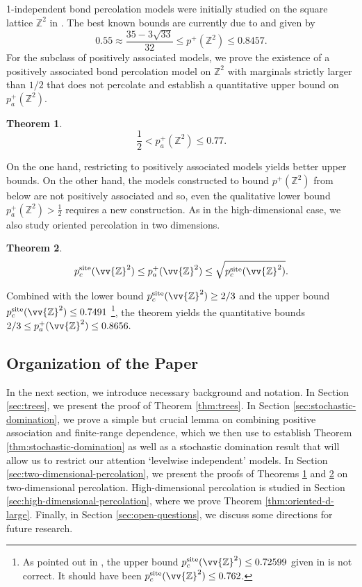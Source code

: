 \documentclass[11pt]{article}
\newcommand{\Z}{\mathbb{Z}}
\newtheorem{theorem}{Theorem}
\theoremstyle{remark}
\begin{document}
1-independent bond percolation models were initially studied on the square lattice $\Z^2$ in \cite{Balister2005}. The best known bounds are currently due to \cite{Balister2022} and given by
\begin{equation*}
	0.55 \approx \frac{35-3\sqrt{33}}{32}\le p^+(\Z^2) \le 0.8457.
\end{equation*} 
For the subclass of positively associated models, we prove the existence of a positively associated bond percolation model on $\Z^2$ with marginals strictly larger than $1/2$ that does not percolate and establish a quantitative upper bound on $p^+_a(\Z^2)$.
\begin{theorem}\label{thm:unoriented-d-2}
	\begin{equation*}
	\frac{1}{2} < p^+_a(\Z^2) \le 0.77.
	\end{equation*} 
\end{theorem}
On the one hand, restricting to positively associated models yields better upper bounds. On the other hand, the models constructed to bound $p^+(\Z^2)$ from below are not positively associated and so, even the qualitative lower bound $p^+_a(\Z^2) > \frac{1}{2}$ requires a new construction.
As in the high-dimensional case, we also study oriented percolation in two dimensions.
\begin{theorem}\label{thm:oriented-d-2}
	\begin{equation*}
		p_c^{\mathrm{site}}(\vv{\Z}^2) \le p_a^+(\vv{\Z}^2) \le  \sqrt{p_c^{\mathrm{site}}(\vv{\Z}^2)}.
	\end{equation*} 
\end{theorem}
Combined with the lower bound $p_c^{\mathrm{site}}(\vv{\Z}^2) \ge 2/3$ \cite{Bishir1963} and the upper bound $p_c^{\mathrm{site}}(\vv{\Z}^2) \le 0.7491$ \cite{balister1994improved}\footnote{As pointed out in \cite{balister1994improved}, the upper bound $p_c^{\mathrm{site}}(\vv{\Z}^2) \le 0.72599$ given in \cite{Balister1993} is not correct. It should have been $p_c^{\mathrm{site}}(\vv{\Z}^2) \le 0.762$.}, the theorem yields the quantitative bounds $2/3 \le p^+_a(\vv{\Z}^2) \le  0.8656.$


\subsection*{Organization of the Paper}
In the next section, we introduce necessary background and notation. In Section \ref{sec:trees}, we present the proof of Theorem \ref{thm:trees}. In Section \ref{sec:stochastic-domination}, we prove a simple but crucial lemma on combining positive association and finite-range dependence, which we then use to establish Theorem \ref{thm:stochastic-domination} as well as a stochastic domination result that will allow us to restrict our attention `levelwise independent' models. In Section \ref{sec:two-dimensional-percolation}, we present the proofs of Theorems \ref{thm:unoriented-d-2} and \ref{thm:oriented-d-2} on two-dimensional percolation. High-dimensional percolation is studied in Section \ref{sec:high-dimensional-percolation}, where we prove Theorem \ref{thm:oriented-d-large}. Finally, in Section \ref{sec:open-questions}, we discuss some directions for future research.
\end{document}
